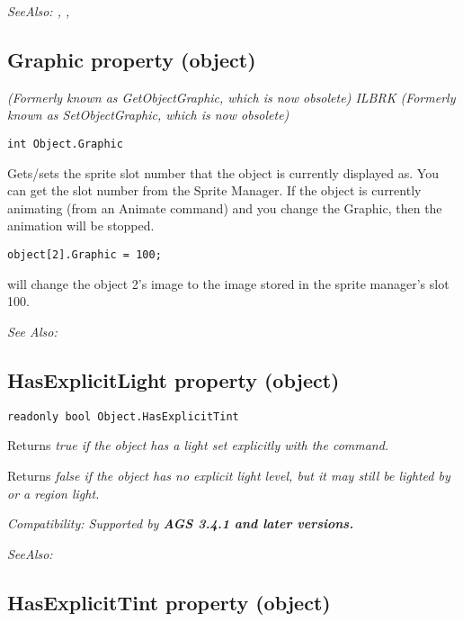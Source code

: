 \it{SeeAlso:} ,
,


\subsection{Graphic property (object)}\label{Object.Graphic}%

\it{(Formerly known as GetObjectGraphic, which is now obsolete)} ILBRK
\it{(Formerly known as SetObjectGraphic, which is now obsolete)}

\begin{verbatim}
int Object.Graphic
\end{verbatim}
Gets/sets the sprite slot number that the object is currently displayed as.
You can get the slot number from the Sprite Manager. If the object is
currently animating (from an Animate command) and you change the Graphic, then the
animation will be stopped.

\begin{verbatim}
object[2].Graphic = 100;
\end{verbatim}
will change the object 2's image to the image stored in the sprite manager's slot 100.

\it{See Also:} 


\subsection{HasExplicitLight property (object)}\label{Object.HasExplicitLight}%

\begin{verbatim}
readonly bool Object.HasExplicitTint
\end{verbatim}
Returns \it{true} if the object has a light set explicitly with the
 command.

Returns \it{false} if the object has no explicit light level, but it may still be
lighted by  or a region light.

\it{Compatibility:} Supported by \bf{AGS 3.4.1} and later versions.

\it{SeeAlso:} 


\subsection{HasExplicitTint property (object)}\label{Object.HasExplicitTint}%


